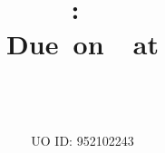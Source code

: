 \usepackage{extramarks}
\usepackage{multicol}


\def\type{problem}

\topmargin=-0.45in
\evensidemargin=0in
\oddsidemargin=0in
\textwidth=6.5in
\textheight=9.0in
\headsep=0.25in

\linespread{1.1}

\renewcommand\headrulewidth{0.4pt}
\renewcommand\footrulewidth{0.4pt}

\pagestyle{fancy}

\makeatletter
\def\removeSpaces#1{\zap@space#1 \@empty}

\fancyhead[L]{\hmwkAuthorName}
\fancyhead[C]{\hwkClassShort: \hmwkClass}
\fancyhead[R]{\hmwkTitle: \hmwkClassInstructorShortName}
\fancyfoot[L]{\lastxmark}
\fancyfoot[C]{\thepage}
\fancyfoot[R]{}

\title{
  \vspace{2in}\textmd{\textmd{\textbf{\hmwkClass:\ \hmwkTitle}}} \\
  \normalsize\vspace{0.1in}\small{Due\ on\ \hmwkDueDate\ at \hmwkDueTime} \\
  \vspace{0.1in}\large{\textit{\hmwkClassInstructor\ \hmwkClassTime}}\vspace{3in}
}

\author{\hmwkAuthorName\\[-1em] \small{UO ID: 952102243}}
\date{}
\makeatother

\renewenvironment{problem}[1][-1]{\ifthenelse{\equal{\type}{problem}}{\noindent\textbf{Problem #1}.}{\noindent\textbf{Exercise #1}.}}{}
